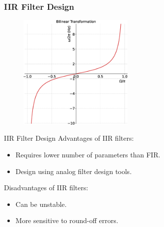 \documentclass[aspectratio=169]{beamer}
\let\olditem\item
\renewcommand{\item}{\setlength{\itemsep}{\fill}\olditem}
\begin{document}
\begin{frame}[t]
  \frametitle{IIR Filter Design}
  \begin{figure}
  \centering
  \includegraphics[width=0.5\textwidth]{img/bilintransinv2.eps}
  \end{figure}
\end{frame}


\begin{frame}{IIR Filter Design}
  Advantages of IIR filters:
  \begin{itemize}
    \item Requires lower number of parameters than FIR.
    \item Design using analog filter design tools.
  \end{itemize}
  \vspace{1cm}

  Disadvantages of IIR filters:
  \begin{itemize}
    \item Can be unstable.
    \item More sensitive to round-off errors.
  \end{itemize}
  \vspace{1cm}
\end{frame}
\end{document}
